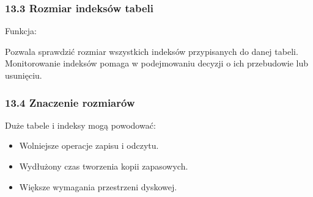 \documentclass[letterpaper,10pt,polish]{sphinxmanual}
\begin{document}
\begin{sphinxVerbatim}[commandchars=\\\{\}]
    
    
 
   
\end{sphinxVerbatim}


\subsubsection{13.3 Rozmiar indeksów tabeli}
\label{\detokenize{rozdzial2/Konfiguracja_baz_danych/Konfiguracja_baz_danych:rozmiar-indeksow-tabeli}}
\sphinxAtStartPar
Funkcja:

\begin{sphinxVerbatim}[commandchars=\\\{\}]
\end{sphinxVerbatim}

\sphinxAtStartPar
Pozwala sprawdzić rozmiar wszystkich indeksów przypisanych do danej tabeli. Monitorowanie indeksów pomaga w podejmowaniu decyzji o ich przebudowie lub usunięciu.


\subsubsection{13.4 Znaczenie rozmiarów}
\label{\detokenize{rozdzial2/Konfiguracja_baz_danych/Konfiguracja_baz_danych:znaczenie-rozmiarow}}
\sphinxAtStartPar
Duże tabele i indeksy mogą powodować:
\begin{itemize}
\item {} 
\sphinxAtStartPar
Wolniejsze operacje zapisu i odczytu.

\item {} 
\sphinxAtStartPar
Wydłużony czas tworzenia kopii zapasowych.

\item {} 
\sphinxAtStartPar
Większe wymagania przestrzeni dyskowej.

\end{itemize}
\end{document}
